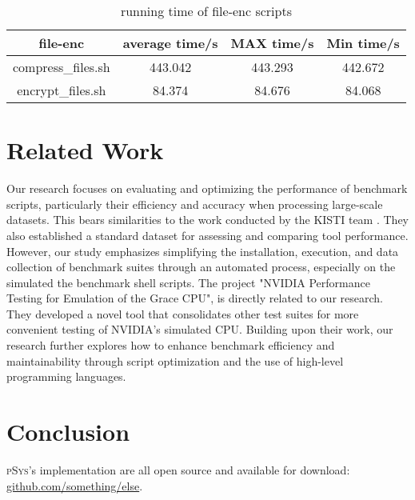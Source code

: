 \documentclass[sigplan, screen, 10pt]{acmart}
\newcommand{\sys}{{\scshape pSys}\xspace}
\begin{document}
\begin{table}[]
    \centering
    \begin{tabular}{c|c|c|c}
        \textbf{file-enc}& \textbf{average time/s} & \textbf{MAX time/s} & \textbf{Min time/s} \\
         \hline
         compress_files.sh & 443.042 & 443.293 & 442.672 \\
         encrypt_files.sh & 84.374 & 84.676 & 84.068 \\
         \hline
    \end{tabular}
    \caption{running time of file-enc scripts}
\end{table}

\section{Related Work}
\label{related}
Our research focuses on evaluating and optimizing the performance of benchmark scripts, particularly their efficiency and accuracy when processing large-scale datasets.\newline
This bears similarities to the work conducted by the KISTI team \cite{kim2015webshark}.   
They also established a standard dataset for assessing and comparing tool performance.
However, our study emphasizes simplifying the installation, execution, and data collection of benchmark suites through an automated process, especially on the simulated the benchmark shell scripts.\newline
The project "NVIDIA Performance Testing for Emulation of the Grace CPU"\cite{fan2021nvidia}, is directly related to our research.
They developed a novel tool that consolidates other test suites for more convenient testing of NVIDIA's simulated CPU. 
Building upon their work, our research further explores how to enhance benchmark efficiency and maintainability through script optimization and the use of high-level programming languages.\newline

\section{Conclusion}
\label{conclusion}

\sys's implementation are all open source and available for download:
\href{https://github.com/something/else}{github.com/something/else}.


{\small

}
\end{document}
